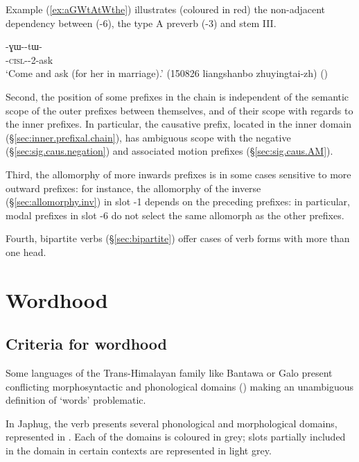  Example (\ref{ex:aGWtAtWthe}) illustrates (coloured in red) the non-adjacent dependency between  (-6), the type A preverb (-3) and stem III.
 
 \begin{exe}
\ex \label{ex:aGWtAtWthe}
\gll {}-ɣɯ--tɯ- \\
 -\textsc{cisl}--2-ask\rouge{[III]} \\
\glt `Come and ask (for her in marriage).' (150826 liangshanbo zhuyingtai-zh) ()
\end{exe}
 
  
Second, the position of some prefixes in the chain is independent of the semantic scope of the outer prefixes between themselves, and of their scope with regards to the inner prefixes.  In particular, the causative prefix, located in the inner domain (§\ref{sec:inner.prefixal.chain}), has ambiguous scope with the negative (§\ref{sec:sig.caus.negation}) and associated motion prefixes (§\ref{sec:sig.caus.AM}).  

Third, the allomorphy of more inwards prefixes is in some cases sensitive to more outward prefixes: for instance, the allomorphy of the inverse (§\ref{sec:allomorphy.inv}) in slot -1 depends on the preceding prefixes: in particular, modal prefixes in slot -6 do not select the same allomorph as the other prefixes. 

Fourth, bipartite verbs (§\ref{sec:bipartite}) offer cases of verb forms with more than one head.


 \section{Wordhood} \label{sec:wordhood.verb}

\subsection{Criteria for wordhood} \label{sec:wordhood.criteria.verb}
Some languages of the Trans-Himalayan family  like Bantawa or Galo present conflicting morphosyntactic and phonological domains (\citealt{post09disunity, schiering10prosodic, doornenbal09}) making an unambiguous definition of `words' problematic.
 
In Japhug, the verb presents several phonological and morphological domains, represented in . Each of the domains is coloured in grey; slots partially included in the domain in certain contexts are represented in light grey.
 
